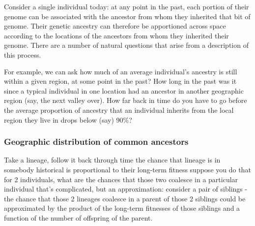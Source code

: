 \documentclass{ar-1col}
\newcommand{\todo}[1]{{\textbf{\color{red}{#1}}}}
\begin{document}
Consider a single individual today:
at any point in the past,
each portion of their genome can be associated with the ancestor from whom they inherited that bit of genome.
Their genetic ancestry can therefore be apportioned across space according
to the locations of the ancestors from whom they inherited their genome.
There are a number of natural questions that arise from a description of this process.

For example, we can ask how much of an average individual's ancestry is still within a given region, at some point in the past?
How long in the past was it since a typical individual in one location had an ancestor
in another geographic region (say, the next valley over).
How far back in time do you have to go before the average proportion of ancestry that an individual inherits
from the local region they live in drops below (say) 90\%?

\todo{tidy and conclude}

\begin{figure}[ht]
    \centering
        \caption{
		\todo{individuals shaded according to the proportion of ancestry 
		of a given small cluster of samples they contribute, 
		at several points back in time - shows spread of ancestry across space through time}
        }
        \label{ancestry_spread}
\end{figure}

\subsubsection{Geographic distribution of common ancestors}

Take a lineage, follow it back through time
the chance that lineage is in somebody historical is proportional to their long-term fitness
suppose you do that for 2 individuals,
what are the chances that those two coalesce in a particular individual
that's complicated,
but an approximation:
consider a pair of siblings - the chance that those 2 lineages coalesce in a parent of those 2 siblings could be approximated by the product of the long-term fitnesses of those siblings
and a function of the number of offspring of the parent.

\todo{tidy and conclude}
\end{document}
